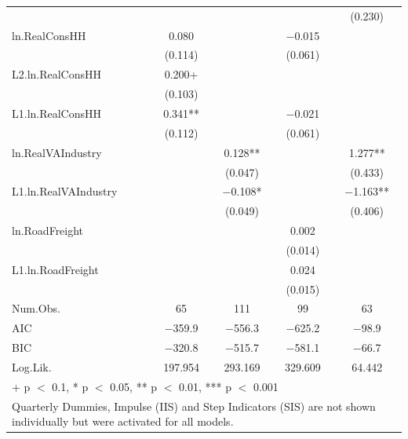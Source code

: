 \begin{table}
{\begin{tabular}[t]{lcccc}
 &  &  &  & (\num{0.230})\\
ln.RealConsHH & \num{0.080} &  & \num{-0.015} & \\
 & (\num{0.114}) &  & (\num{0.061}) & \\
L2.ln.RealConsHH & \num{0.200}+ &  &  & \\
 & (\num{0.103}) &  &  & \\
L1.ln.RealConsHH & \num{0.341}** &  & \num{-0.021} & \\
 & (\num{0.112}) &  & (\num{0.061}) & \\
ln.RealVAIndustry &  & \num{0.128}** &  & \num{1.277}**\\
 &  & (\num{0.047}) &  & (\num{0.433})\\
L1.ln.RealVAIndustry &  & \num{-0.108}* &  & \num{-1.163}**\\
 &  & (\num{0.049}) &  & (\num{0.406})\\
ln.RoadFreight &  &  & \num{0.002} & \\
 &  &  & (\num{0.014}) & \\
L1.ln.RoadFreight &  &  & \num{0.024} & \\
 &  &  & (\num{0.015}) & \\
\midrule
Num.Obs. & \num{65} & \num{111} & \num{99} & \num{63}\\
AIC & \num{-359.9} & \num{-556.3} & \num{-625.2} & \num{-98.9}\\
BIC & \num{-320.8} & \num{-515.7} & \num{-581.1} & \num{-66.7}\\
Log.Lik. & \num{197.954} & \num{293.169} & \num{329.609} & \num{64.442}\\
\bottomrule
\multicolumn{5}{l}{\rule{0pt}{1em}+ p $<$ 0.1, * p $<$ 0.05, ** p $<$ 0.01, *** p $<$ 0.001}\\
\multicolumn{5}{l}{\rule{0pt}{1em}Quarterly Dummies, Impulse (IIS) and Step Indicators (SIS) are not shown individually but were activated for all models.}\\
\end{tabular}}
\end{table}

